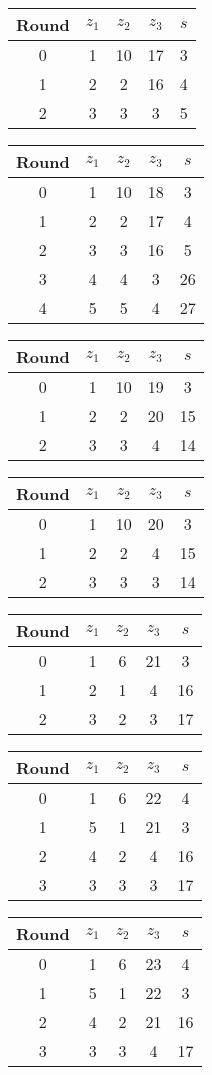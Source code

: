 \begin{multicols}{2}
\begin{tabular}{c | c | c | c | c }
Round & $z_1$ & $z_2$ & $z_3$ & $s$ \\
\hline
0 & 1 & 10 & 17 & 3 \\
1 & 2 & 2 & 16 & 4 \\
2 & 3 & 3 & 3 & 5
\end{tabular}


\begin{tabular}{c | c | c | c | c }
Round & $z_1$ & $z_2$ & $z_3$ & $s$ \\
\hline
0 & 1 & 10 & 18 & 3 \\
1 & 2 & 2 & 17 & 4 \\
2 & 3 & 3 & 16 & 5 \\
3 & 4 & 4 & 3 & 26 \\
4 & 5 & 5 & 4 & 27
\end{tabular}


\begin{tabular}{c | c | c | c | c }
Round & $z_1$ & $z_2$ & $z_3$ & $s$ \\
\hline
0 & 1 & 10 & 19 & 3 \\
1 & 2 & 2 & 20 & 15 \\
2 & 3 & 3 & 4 & 14
\end{tabular}


\begin{tabular}{c | c | c | c | c }
Round & $z_1$ & $z_2$ & $z_3$ & $s$ \\
\hline
0 & 1 & 10 & 20 & 3 \\
1 & 2 & 2 & 4 & 15 \\
2 & 3 & 3 & 3 & 14
\end{tabular}


\begin{tabular}{c | c | c | c | c }
Round & $z_1$ & $z_2$ & $z_3$ & $s$ \\
\hline
0 & 1 & 6 & 21 & 3 \\
1 & 2 & 1 & 4 & 16 \\
2 & 3 & 2 & 3 & 17
\end{tabular}


\begin{tabular}{c | c | c | c | c }
Round & $z_1$ & $z_2$ & $z_3$ & $s$ \\
\hline
0 & 1 & 6 & 22 & 4 \\
1 & 5 & 1 & 21 & 3 \\
2 & 4 & 2 & 4 & 16 \\
3 & 3 & 3 & 3 & 17
\end{tabular}


\begin{tabular}{c | c | c | c | c }
Round & $z_1$ & $z_2$ & $z_3$ & $s$ \\
\hline
0 & 1 & 6 & 23 & 4 \\
1 & 5 & 1 & 22 & 3 \\
2 & 4 & 2 & 21 & 16 \\
3 & 3 & 3 & 4 & 17
\end{tabular}



\end{multicols}

